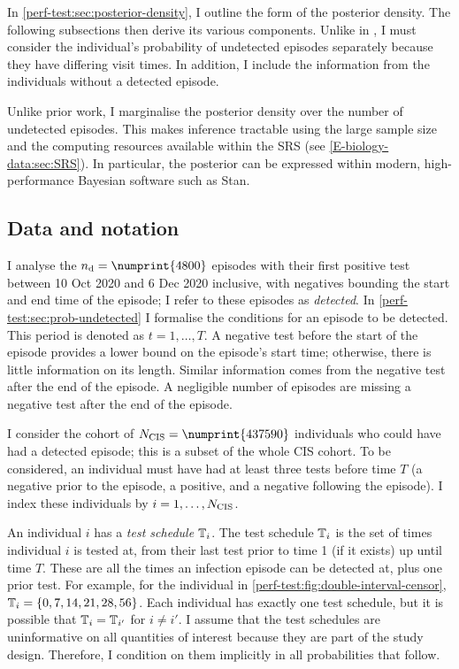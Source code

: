 \documentclass[thesis.tex]{subfiles}
\begin{document}
In \cref{perf-test:sec:posterior-density}, I outline the form of the posterior density.
The following subsections then derive its various components.
Unlike in \textcite{heiseyModelling}, I must consider the individual's probability of undetected episodes separately because they have differing visit times.
In addition, I include the information from the individuals without a detected episode.

Unlike prior work, I marginalise the posterior density over the number of undetected episodes.
This makes inference tractable using the large sample size and the computing resources available within the SRS (see \cref{E-biology-data:sec:SRS}).
In particular, the posterior can be expressed within modern, high-performance Bayesian software such as Stan.

\subsection{Data and notation} \label{perf-test:sec:data-notation}

I analyse the $\ndet = \numprint{4800}$ episodes with their first positive test between 10 Oct 2020 and 6 Dec 2020 inclusive, with negatives bounding the start and end time of the episode; I refer to these episodes as \emph{detected}.
In \cref{perf-test:sec:prob-undetected} I formalise the conditions for an episode to be detected.
This period is denoted as $t = 1, \dots, T$.
A negative test before the start of the episode provides a lower bound on the episode's start time; otherwise, there is little information on its length.
Similar information comes from the negative test after the end of the episode.
A negligible number of episodes are missing a negative test after the end of the episode.

I consider the cohort of $\Ncis = \numprint{437590}$ individuals who could have had a detected episode; this is a subset of the whole CIS cohort.
To be considered, an individual must have had at least three tests before time $T$ (a negative prior to the episode, a positive, and a negative following the episode).
I index these individuals by $i = 1, \dots, N_\text{CIS}$.

An individual $i$ has a \emph{test schedule} $\mathbb{T}_i$.
The test schedule $\mathbb{T}_i$ is the set of times individual $i$ is tested at, from their last test prior to time 1 (if it exists) up until time $T$.
These are all the times an infection episode can be detected at, plus one prior test.
For example, for the individual in \cref{perf-test:fig:double-interval-censor}, $\mathbb{T}_i = \{ 0, 7, 14, 21, 28, 56 \}$.
Each individual has exactly one test schedule, but it is possible that $\mathbb{T}_i = \mathbb{T}_{i'}$ for $i \neq i'$.
I assume that the test schedules are uninformative on all quantities of interest because they are part of the study design.
Therefore, I condition on them implicitly in all probabilities that follow.
\end{document}
